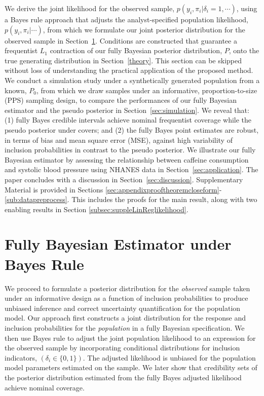 \documentclass[]{imsart}
\begin{document}
We derive the joint likelihood for the observed sample, $p(y_{i},\pi_{i}\vert \delta_{i} = 1,\cdots)$, using a Bayes rule approach that adjusts the analyst-specified population likelihood, $p(y_{i},\pi_{i}\vert \cdots)$, from which we formulate our joint posterior distribution for the observed sample in Section~\ref{method}.   Conditions are constructed that guarantee a frequentist $L_{1}$ contraction of our fully Bayesian posterior distribution, $P$, onto the true generating distribution in Section~\ref{theory}. This section can be skipped without loss of understanding the practical application of the proposed method. We conduct a simulation study under a synthetically generated population from a known, $P_{0}$, from which we draw samples under an informative, proportion-to-size (PPS) sampling design, to compare the performances of our fully Bayesian estimator and the pseudo posterior in Section~\ref{sec:simulation}.
We reveal that: (1) fully Bayes credible intervals achieve nominal frequentist coverage
while the pseudo posterior under covers; and (2) the fully Bayes point estimates are robust, in terms of bias and mean square error (MSE), against high variability of inclusion probabilities in contrast to the pseudo posterior.
We illustrate our fully Bayesian estimator by assessing the relationship between caffeine consumption and systolic blood pressure using NHANES data in Section~\ref{sec:application}.
The paper concludes with a discussion in Section~\ref{sec:discussion}.
Supplementary Material is provided in  Sections \ref{sec:appendixprooftheoremcloseform}-\ref{sub:datapreprocess}. This includes the proofs for the main result, along with two enabling results in  Section \ref{subsec:suppleLinReglikelihood}.


\section{Fully Bayesian Estimator under Bayes Rule}\label{method}
We proceed to formulate a posterior distribution for the \emph{observed} sample taken under an informative design as a function of inclusion probabilities to produce unbiased inference and correct uncertainty quantification for the population model.  Our approach first constructs a joint distribution for the response and inclusion probabilities for the \emph{population} in a fully Bayesian specification.  We then use Bayes rule to adjust the joint population likelihood to an expression for the observed sample by incorporating conditional distributions for inclusion indicators, $(\delta_{i} \in\{0,1\})$.  The adjusted likelihood is unbiased for the population model parameters estimated on the sample.  We later show that credibility sets of the posterior distribution estimated from the fully Bayes adjusted likelihood achieve nominal coverage.
\end{document}
